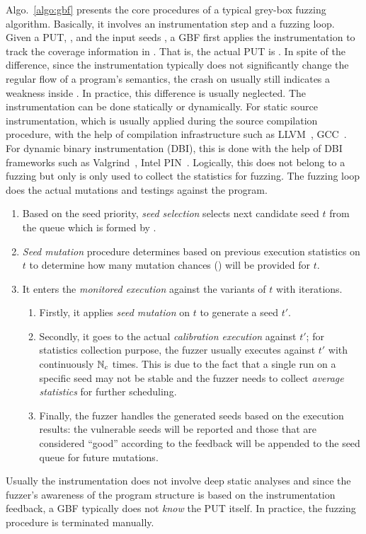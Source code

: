 Algo.~\ref{algo:gbf} presents the core procedures of a typical grey-box fuzzing algorithm. Basically, it involves an instrumentation step and a fuzzing loop.
Given a PUT, \ProgO, and the input seeds \Seeds, a GBF first applies the instrumentation to track the coverage information in \ProgO. That is, the actual PUT is \Prog. In spite of the difference, since the instrumentation typically does not significantly change the regular flow of a program's semantics, the crash on \Prog usually still indicates a weakness inside \ProgO. In practice, this difference is usually neglected.
The instrumentation can be done statically or dynamically. For static source instrumentation, which is usually applied during the source compilation procedure, with the help of compilation infrastructure such as LLVM~\cite{Lattner:2004:LCF:977395.977673}, GCC~\cite{gcc}. For dynamic binary instrumentation (DBI), this is done with the help of DBI frameworks such as Valgrind~\cite{valgrind}, Intel PIN~\cite{pin}. Logically, this does not belong to a fuzzing but only is only used to collect the statistics for fuzzing.
The fuzzing loop does the actual mutations and testings against the program.
\begin{enumerate}
	\item Based on the seed priority, \emph{seed selection} selects next candidate seed $t$ from the queue which is formed by \Seeds.
	\item \emph{Seed mutation} procedure determines based on previous execution statistics on $t$ to determine how many mutation chances (\mutChance) will be provided for $t$.
	\item It enters the \emph{monitored execution} against the variants of $t$ with \mutChance iterations. 
	\begin{enumerate}
	\item Firstly, it applies \emph{seed mutation} on $t$ to generate a seed $t'$. 
	\item Secondly, it goes to the actual \emph{calibration execution} against $t'$; for statistics collection purpose, the fuzzer usually executes \Prog against $t'$ with continuously $\mathbb{N}_{c}$ times. This is due to the fact that a single run on a specific seed may not be stable and the fuzzer needs to collect \emph{average statistics} for further scheduling.
	\item Finally, the fuzzer handles the generated seeds based on the execution results: the vulnerable seeds will be reported and those that are considered ``good'' according to the feedback will be appended to the seed queue for future mutations.
	\end{enumerate}
\end{enumerate}
Usually the instrumentation does not involve deep static analyses and since the fuzzer's awareness of the program structure is based on the instrumentation feedback, a GBF typically does not \emph{know} the PUT itself. In practice, the fuzzing procedure is terminated manually.

